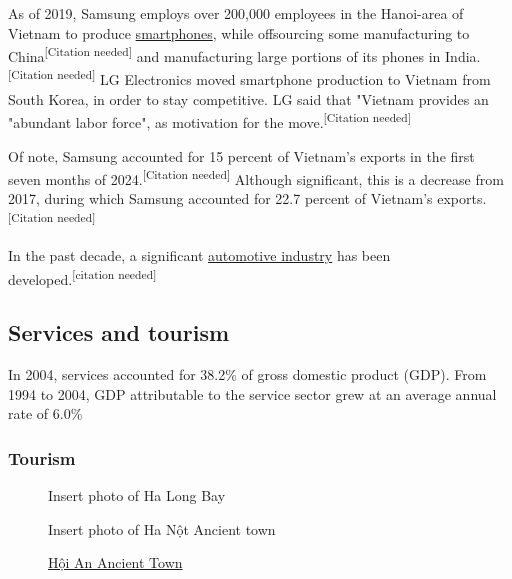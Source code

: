 \documentclass{article}
\begin{document}
As of 2019, Samsung employs over 200,000 employees in the Hanoi-area of Vietnam to produce \href{https://en.wikipedia.org/wiki/Smartphones}{smartphones}, while offsourcing some manufacturing to China\textsuperscript{[Citation needed]} and manufacturing large portions of its phones in Ind\-ia.\textsuperscript{[Citation needed]} LG Electronics moved smartphone production to Vietnam from South Korea, in order to stay competitive. LG said that "Vietnam provides an "abundant labor force", as motivation for the move.\textsuperscript{[Citation needed]}

Of note, Samsung accounted for 15 percent of Vietnam's exports in the first seven months of 2024.\textsuperscript{[Citation needed]} Although significant, this is a decrease from 2017, during which Samsung accounted for 22.7 percent of Vietnam's exports.\textsuperscript{[Citation needed]}

In the past decade, a significant \href{https://en.wikipedia.org/wiki/Automotive_industry_in_Vietnam}{automotive industry} has been \\developed.\textsuperscript{[citation needed]}

\subsection*{Services and tourism}
In 2004, services accounted for 38.2\% of gross domestic product (GDP). From 1994 to 2004, GDP attributable to the service sector grew at an average annual rate of 6.0\%
\subsubsection*{Tourism}


\begin{figure}
    
    \begin{framed}
    \begin{minipage}[t]{0.5\textwidth}
        Insert photo of Ha Long Bay
        \caption*{Hạ Long Bay was recognised as a World Heritage Site in 1994.}
    \end{minipage}
    \hspace{5pt}
    \begin{minipage}[t]{0.45\textwidth}
        Insert photo of Ha Nột Ancient town
        \caption*{\href{https://en.wikipedia.org/wiki/Hoi_An}{Hội An Ancient Town}}
    \end{minipage}
\end{framed}
\end{figure}
\end{document}
